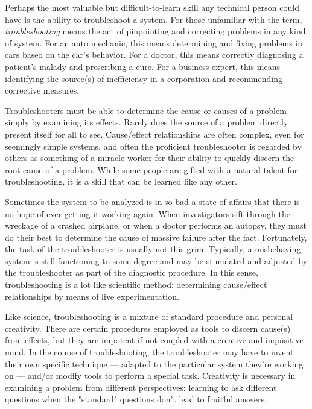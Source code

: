 \startchapter[title={Theory And Practice}]

\startsection[title={Troubleshooting}]

Perhaps the most valuable but difficult-to-learn skill any technical
person could have is the ability to troubleshoot a system. For those
unfamiliar with the term, {\em troubleshooting} means the act of
pinpointing and correcting problems in any kind of system. For an auto
mechanic, this means determining and fixing problems in cars based on
the car's behavior. For a doctor, this means correctly diagnosing a
patient's malady and prescribing a cure. For a business expert, this
means identifying the source(s) of inefficiency in a corporation and
recommending corrective measures.

Troubleshooters must be able to determine the cause or causes of a
problem simply by examining its effects. Rarely does the source of a
problem directly present itself for all to see. Cause/effect
relationships are often complex, even for seemingly simple systems, and
often the proficient troubleshooter is regarded by others as something
of a miracle-worker for their ability to quickly discern the root cause
of a problem. While some people are gifted with a natural talent for
troubleshooting, it is a skill that can be learned like any other.

Sometimes the system to be analyzed is in so bad a state of affairs that
there is no hope of ever getting it working again. When investigators
sift through the wreckage of a crashed airplane, or when a doctor
performs an autopsy, they must do their best to determine the cause of
massive failure after the fact. Fortunately, the task of the
troubleshooter is usually not this grim. Typically, a misbehaving system
is still functioning to some degree and may be stimulated and adjusted
by the troubleshooter as part of the diagnostic procedure. In this
sense, troubleshooting is a lot like scientific method: determining
cause/effect relationships by means of live experimentation.

Like science, troubleshooting is a mixture of standard procedure and
personal creativity. There are certain procedures employed as tools to
discern cause(s) from effects, but they are impotent if not coupled with
a creative and inquisitive mind. In the course of troubleshooting, the
troubleshooter may have to invent their own specific technique ---
adapted to the particular system they're working on --- and/or modify
tools to perform a special task. Creativity is necessary in examining a
problem from different perspectives: learning to ask different questions
when the "standard" questions don't lead to fruitful answers.

